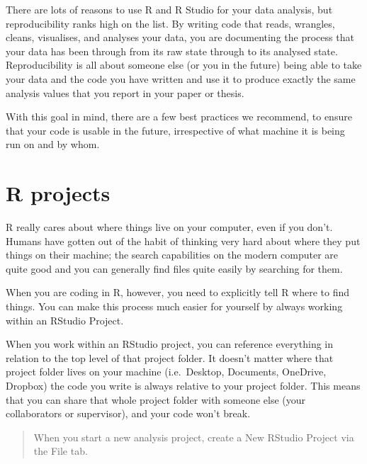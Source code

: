 \documentclass[
  letterpaper,
  DIV=11,
  numbers=noendperiod]{scrreprt}
\begin{document}
There are lots of reasons to use R and R Studio for your data analysis,
but reproducibility ranks high on the list. By writing code that reads,
wrangles, cleans, visualises, and analyses your data, you are
documenting the process that your data has been through from its raw
state through to its analysed state. Reproducibility is all about
someone else (or you in the future) being able to take your data and the
code you have written and use it to produce exactly the same analysis
values that you report in your paper or thesis.

With this goal in mind, there are a few best practices we recommend, to
ensure that your code is usable in the future, irrespective of what
machine it is being run on and by whom.

\section{R projects}\label{r-projects}

R really cares about where things live on your computer, even if you
don't. Humans have gotten out of the habit of thinking very hard about
where they put things on their machine; the search capabilities on the
modern computer are quite good and you can generally find files quite
easily by searching for them.

When you are coding in R, however, you need to explicitly tell R where
to find things. You can make this process much easier for yourself by
always working within an RStudio Project.

When you work within an RStudio project, you can reference everything in
relation to the top level of that project folder. It doesn't matter
where that project folder lives on your machine (i.e.~Desktop,
Documents, OneDrive, Dropbox) the code you write is always relative to
your project folder. This means that you can share that whole project
folder with someone else (your collaborators or supervisor), and your
code won't break.

\begin{quote}
When you start a new analysis project, create a New RStudio Project via
the File tab.
\end{quote}
\end{document}
